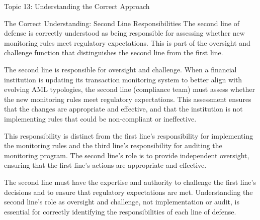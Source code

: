 \documentclass[5pt]{beamer}
\begin{document}
	\begin{frame}{Topic 13: Understanding the Correct Approach}
		\begin{block}{\tiny The Correct Understanding: Second Line Responsibilities}
			\tiny The second line of defense is correctly understood as being responsible for assessing whether new monitoring rules meet regulatory expectations. This is part of the oversight and challenge function that distinguishes the second line from the first line.
			
			The second line is responsible for oversight and challenge. When a financial institution is updating its transaction monitoring system to better align with evolving AML typologies, the second line (compliance team) must assess whether the new monitoring rules meet regulatory expectations. This assessment ensures that the changes are appropriate and effective, and that the institution is not implementing rules that could be non-compliant or ineffective.
			
			This responsibility is distinct from the first line's responsibility for implementing the monitoring rules and the third line's responsibility for auditing the monitoring program. The second line's role is to provide independent oversight, ensuring that the first line's actions are appropriate and effective.
			
			The second line must have the expertise and authority to challenge the first line's decisions and to ensure that regulatory expectations are met. Understanding the second line's role as oversight and challenge, not implementation or audit, is essential for correctly identifying the responsibilities of each line of defense.
		\end{block}
	\end{frame}
	
\end{document}

